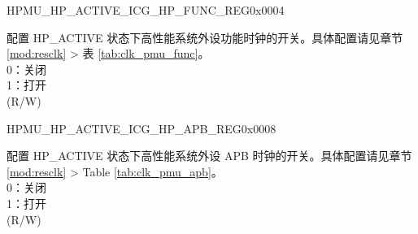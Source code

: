 \begin{register}{H}{PMU\_HP\_ACTIVE\_ICG\_HP\_FUNC\_REG}{0x0004}\label{regdesc:PMUHPACTIVEICGHPFUNCREG}
%
\regnewline%
\begin{regdesc}\begin{reglist}
\label{fielddesc:PMUHPACTIVEDIGICGFUNCEN}\item [PMU\_HP\_ACTIVE\_DIG\_ICG\_FUNC\_EN] 配置 HP\_ACTIVE 状态下高性能系统外设功能时钟的开关。具体配置请见章节 \ref{mod:resclk} \textit{} > 表 \ref{tab:clk_pmu_func}。 \\
0：关闭\\
1：打开\\
(R/W)
\end{reglist}\end{regdesc}
\end{register}


\begin{register}{H}{PMU\_HP\_ACTIVE\_ICG\_HP\_APB\_REG}{0x0008}\label{regdesc:PMUHPACTIVEICGHPAPBREG}
%
\regnewline%
\begin{regdesc}\begin{reglist}
\label{fielddesc:PMUHPACTIVEDIGICGAPBEN}\item [PMU\_HP\_ACTIVE\_DIG\_ICG\_APB\_EN] 配置 HP\_ACTIVE 状态下高性能系统外设 APB 时钟的开关。具体配置请见章节 \ref{mod:resclk} \textit{} > Table \ref{tab:clk_pmu_apb}。\\
0：关闭\\
1：打开\\
(R/W)
\end{reglist}\end{regdesc}
\end{register}




